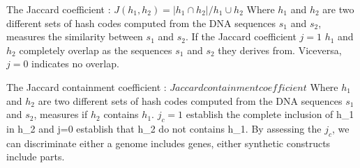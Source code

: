 \documentclass[11pt, a4paper]{article}
\begin{document}
The Jaccard coefficient :
$J(h_1,h_2)= |h_1 \cap h_2|/h_1 \cup h_2$
Where $h_1$ and $h_2$ are two different sets of hash codes computed from the DNA sequences $s_1$ and $s_2$, measures the similarity between $s_1$ and $s_2$.
If the Jaccard coefficient $j = 1$ $h_1$ and $h_2$ completely overlap as the sequences $s_1$ and $s_2$ they derives from. Viceversa, $j=0$ indicates no overlap. 
 
The Jaccard containment coefficient  :
$Jaccard containment coefficient$
Where $h_1$ and $h_2$ are two different sets of hash codes computed from the DNA sequences $s_1$ and $s_2$, measures if $h_2$ contains $h_1$. $j_c =1$ establish the complete 
inclusion of h_1 in h_2 and  j=0  establish that h_2 do not contains h_1.
By assessing the $j_c$, we can discriminate either a genome includes genes, either synthetic constructs include parts.
\end{document}
